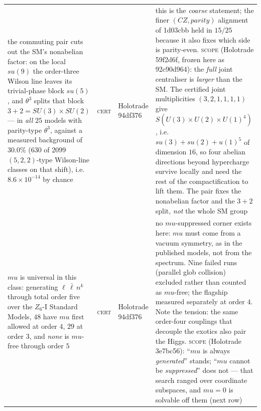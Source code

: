 \documentclass[12pt,a4paper]{article}
\def\mathbb#1{#1}%
\def\mathfrak#1{#1}%
\def\textbf#1{#1}%
\def\texttt#1{#1}%
\def\text#1{#1}%
\def\mu{mu}%
\theoremstyle{definition}
\newcommand{\ZZ}{\mathbb{Z}}
\begin{document}
\begin{center}
\begin{tabular}{@{}p{}llp{}@{}}
\textbf{the commuting pair cuts out the SM's nonabelian factor}: on the local $\mathfrak{su}(9)$ the order-three Wilson line leaves its trivial-phase block $\mathfrak{su}(5)$, and $\theta^3$ splits that block $3{+}2=SU(3){\times}SU(2)$ --- in \emph{all} $25$ models with parity-type $\theta^3$, against a measured background of $30.0\%$ ($630$ of $2099$ $(5,2,2)$-type Wilson-line classes on that shift), i.e.\ $8.6\times10^{-14}$ by chance & \textsc{cert} & Holotrade \texttt{94df376} & this is the \emph{coarse} statement; the finer $(CZ,\text{parity})$ alignment of \texttt{1d03cbb} held in $15/25$ because it also fixes which side is parity-even. \textsc{scope} (Holotrade \texttt{59f2d6f}, frozen here as \texttt{92c90d964}): the \emph{full} joint centraliser is \emph{larger} than the SM. The certified joint multiplicities $(3,2,1,1,1,1)$ give $S(U(3){\times}U(2){\times}U(1)^4)$, i.e.\ $\mathfrak{su}(3){+}\mathfrak{su}(2){+}\mathfrak{u}(1)^5$ of dimension $16$, so four abelian directions beyond hypercharge survive locally and need the rest of the compactification to lift them. The pair fixes the nonabelian factor and the $3{+}2$ split, \emph{not} the whole SM group \\
\textbf{$\mu$ is universal in this class}: generating $\ell\,\bar\ell\,n^k$ through total order five over the $\ZZ_6$-I Standard Models, $48$ have $\mu$ first allowed at order $4$, $29$ at order $3$, and \emph{none} is $\mu$-free through order $5$ & \textsc{cert} & Holotrade \texttt{94df376} & no $\mu$-suppressed corner exists here: $\mu$ must come from a vacuum symmetry, as in the published models, not from the spectrum. Nine failed runs (parallel glob collision) excluded rather than counted as $\mu$-free; the flagship measured separately at order $4$. Note the tension: the same order-four couplings that decouple the exotics also pair the Higgs. \textsc{scope} (Holotrade \texttt{3e7bc56}): ``$\mu$ is always \emph{generated}'' stands; ``$\mu$ cannot be \emph{suppressed}'' does not --- that search ranged over coordinate subspaces, and $\mu=0$ is solvable off them (next row) \\

\end{tabular}
\end{center}
\end{document}
